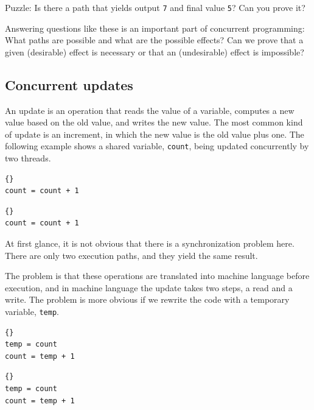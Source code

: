 \documentclass{book}
\begin{document}
Puzzle: Is there a path that yields output {\tt 7} and final
value {\tt 5}?  Can you prove it?

Answering questions like these is an important part of concurrent
programming:  What paths are possible and what are the
possible effects?  Can we prove that a given (desirable) effect is
necessary or that an (undesirable) effect is impossible?


\subsection {Concurrent updates}

An update is an operation that reads the value of a variable, computes
a new value based on the old value, and writes the new value.
The most common kind of update is an increment, in which the
new value is the old value plus one.  The following example
shows a shared variable, {\tt count}, being updated concurrently
by two threads.

\begin{minipage}[t]{0.4\textwidth}
    \begin{lstlisting}[title={Thread A}]{}
count = count + 1
\end{lstlisting}
\end{minipage}
\hfill
\begin{minipage}[t]{0.4\textwidth}
    \begin{lstlisting}[title={Thread B}]{}
count = count + 1
\end{lstlisting}
\end{minipage}

At first glance, it is not obvious that there is a synchronization
problem here.  There are only two execution paths, and they
yield the same result.

The problem is that these operations are translated into
machine language before execution, and in machine language
the update takes two steps, a read and a write.
The problem is more obvious if we rewrite the code with a temporary
variable, {\tt temp}.

\begin{minipage}[t]{0.4\textwidth}
    \begin{lstlisting}[title={Thread A}]{}
temp = count
count = temp + 1
\end{lstlisting}
\end{minipage}
\hfill
\begin{minipage}[t]{0.4\textwidth}
    \begin{lstlisting}[title={Thread B}]{}
temp = count
count = temp + 1
\end{lstlisting}
\end{minipage}
\end{document}
